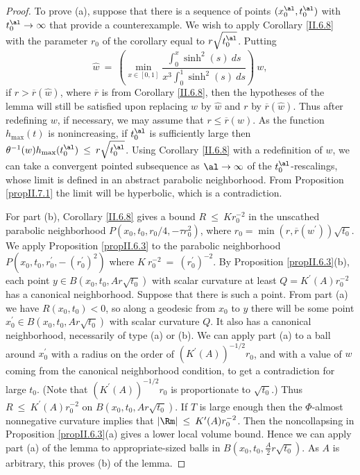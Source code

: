 \begin{proof}
To prove (a), suppose that there is a sequence of points
$(x_0^\al, t_0^\al)$ with $t_0^\al \rightarrow \infty$
that provide a counterexample.  We wish to apply
Corollary \ref{II.6.8} with the parameter $r_0$ of the
corollary equal to $r \sqrt{t_0^\al}$.
Putting
\begin{equation}
\widehat{w} \: = \: \left( \min_{x \in [0,1]} \frac{\int_0^x \sinh^2(s) \:
ds}{x^3 \int_0^1 \sinh^2(s) \: ds} \right) \: w,
\end{equation}
if $r > \overline{r}(\widehat{w})$,
where $\overline{r}$ is from Corollary \ref{II.6.8},
then the hypotheses of the lemma will still be satisfied upon replacing
$w$ by $\widehat{w}$ and
$r$ by $\overline{r}(\widehat{w})$.
Thus
after redefining   $w$, if necessary,
we may assume that $r \le \overline{r}(w)$.
As the function
$h_{\max}(t)$
is nonincreasing, if $t_0^\al$ is sufficiently
large then
$\theta^{-1}(w)h_{\max}(t_0^\al) \: \le \: r \sqrt{t_0^\al}$.
Using Corollary \ref{II.6.8} with a redefinition of $w$,
we can take a convergent pointed subsequence
as $\al \rightarrow \infty$ of the $t_0^\al$-rescalings,
whose limit is defined in an abstract parabolic neighborhood.
From Proposition \ref{propII.7.1}
the limit will be hyperbolic, which is a contradiction.

For part (b), Corollary \ref{II.6.8} gives a bound $R \: \le \: K r_0^{-2}$ in
the unscathed parabolic neighborhood $P(x_0, t_0, r_0/4, -\tau r_0^2)$,
where
$r_0 = \min(r, \overline{r}(w^\prime)) \sqrt{t_0}$.
We apply Proposition \ref{propII.6.3} to the parabolic
neighborhood $P(x_0, t_0, r_0^\prime, - \: (r_0^\prime)^2)$ where
$K \: r_0^{-2} \: = \: (r_0^\prime)^{-2}$. By Proposition \ref{propII.6.3}(b), each
point $ y\in B(x_0, t_0, Ar\sqrt{t_0})$ with scalar curvature at
least $Q = K^\prime(A) r_0^{-2}$ has a canonical neighborhood.
Suppose that there is such a point.  From part (a) we have $R(x_0, t_0) < 0$, so
along a geodesic from $x_0$ to $y$ there will be some point
$x^\prime_0 \in B(x_0, t_0, Ar\sqrt{t_0})$
with scalar curvature $Q$. It also has a canonical neighborhood,
necessarily of type (a) or (b).
We can apply part (a) to a ball around $x^\prime_0$ with a radius
on the order of $(K^\prime(A))^{-1/2} r_0$, and with a value
of $w$ coming from the canonical neighborhood condition,
to get a contradiction
for large $t_0$.
(Note that $(K^\prime(A))^{-1/2} r_0$ is proportionate to
$\sqrt{t_0}$.)
Thus $R \: \le \: K^\prime(A) r_0^{-2}$
on $B(x_0, t_0, Ar\sqrt{t_0})$. If $T$ is large enough then the
$\Phi$-almost nonnegative curvature implies that $|\Rm| \: \le \:
K^\prime(A) r_0^{-2}$. Then the noncollapsing in
Proposition \ref{propII.6.3}(a) gives a lower local
volume bound. Hence we can apply part (a) of the lemma
to appropriate-sized balls in
$B(x_0, t_0, \frac{A}{2} r\sqrt{t_0})$. As $A$ is arbitrary, this
proves (b) of the lemma.


\end{proof}
